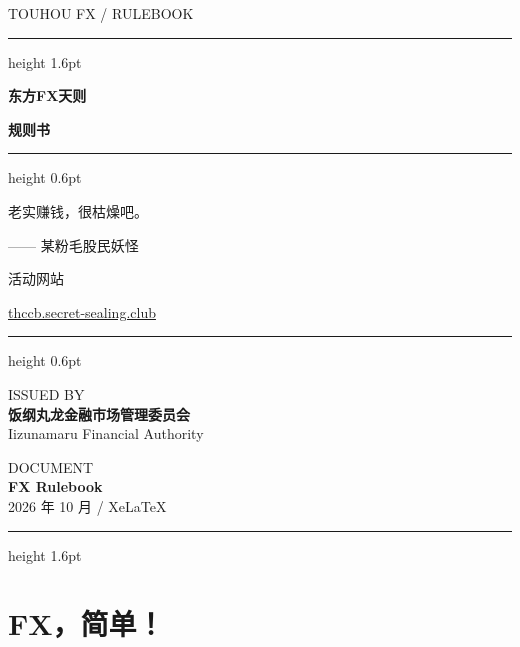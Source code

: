 \documentclass[11pt,a4paper,twoside]{article}
\begin{document}
\begin{titlepage}
\pagecolor{paper}
\begin{center}
\vspace*{1.4cm}
{\sffamily\small\color{soft}TOUHOU FX / RULEBOOK}\par
\vspace{0.5cm}
{\color{rule}\hrule height 1.6pt}
\vspace{0.8cm}
{\sffamily\bfseries\fontsize{38pt}{48pt}\selectfont 东方FX天则}\par
\vspace{0.6cm}
{\sffamily\bfseries\fontsize{24pt}{32pt}\selectfont 规则书}\par
\vspace{0.7cm}
{\color{rule}\hrule height 0.6pt}
\vfill
\fxcovercard\par
\vspace{0.5cm}
{\kai\Large 老实赚钱，很枯燥吧。}\par
\vspace{0.25cm}
{\kai\small\color{soft}—— 某粉毛股民妖怪}\par
\vfill
{\sffamily\small\color{soft}活动网站}\par
\vspace{0.15cm}
{\sffamily\large\href{https://thccb.secret-sealing.club}{thccb.secret-sealing.club}}\par
\vspace{0.6cm}
{\color{rule}\hrule height 0.6pt}
\vspace{0.4cm}
\begin{minipage}{0.53\linewidth}\raggedright
  \sffamily\small\textcolor{soft}{ISSUED BY}\\[0.15em]
  \sffamily\textbf{饭纲丸龙金融市场管理委员会}\\
  \sffamily\small\textcolor{soft}{Iizunamaru Financial Authority}
\end{minipage}\hfill
\begin{minipage}{0.43\linewidth}\raggedleft
  \sffamily\small\textcolor{soft}{DOCUMENT}\\[0.15em]
  \sffamily\textbf{FX Rulebook}\\
  \sffamily\small\textcolor{soft}{2026 年 10 月 / Xe\LaTeX{}}
\end{minipage}
\vspace{0.4cm}
{\color{rule}\hrule height 1.6pt}
\end{center}
\end{titlepage}
\nopagecolor

\section*{FX，简单！}
\end{document}
